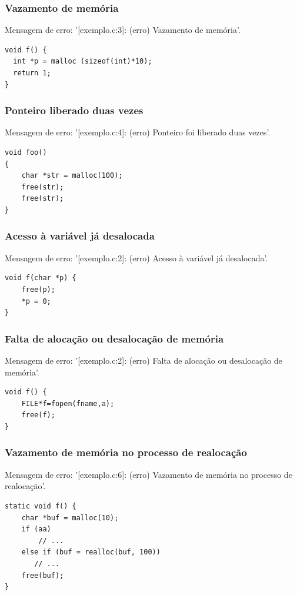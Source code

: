\documentclass[12pt,a4paper]{report}
\begin{document}
\subsubsection{Vazamento de memória}
Mensagem de erro: '[exemplo.c:3]: (erro) Vazamento de memória'.
\begin{lstlisting}[style=CStyle]
void f() {
  int *p = malloc (sizeof(int)*10);
  return 1;
}
\end{lstlisting}

\subsubsection{Ponteiro liberado duas vezes}
Mensagem de erro: '[exemplo.c:4]: (erro) Ponteiro foi liberado duas vezes'.
\begin{lstlisting}[style=CStyle]
void foo()
{
    char *str = malloc(100);
    free(str);
    free(str);
}
\end{lstlisting}

\subsubsection{Acesso à variável já desalocada}
Mensagem de erro: '[exemplo.c:2]: (erro) Acesso à variável já desalocada'.
\begin{lstlisting}[style=CStyle]
void f(char *p) {
    free(p);
    *p = 0;
}
\end{lstlisting}

\subsubsection{Falta de alocação ou desalocação de memória}
Mensagem de erro: '[exemplo.c:2]: (erro) Falta de alocação ou desalocação de memória'.
\begin{lstlisting}[style=CStyle]
void f() {
    FILE*f=fopen(fname,a);
    free(f);
}
\end{lstlisting}

\subsubsection{Vazamento de memória no processo de realocação}
Mensagem de erro: '[exemplo.c:6]: (erro) Vazamento de memória no processo de realocação'.
\begin{lstlisting}[style=CStyle]
static void f() {
    char *buf = malloc(10);
    if (aa)
        // ...
    else if (buf = realloc(buf, 100))
       // ...
    free(buf);
}
\end{lstlisting}
\end{document}
